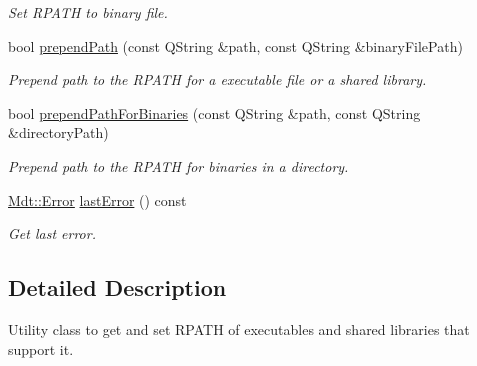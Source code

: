 \begin{DoxyCompactItemize}
\begin{DoxyCompactList}\small\item\em Set R\+P\+A\+TH to binary file. \end{DoxyCompactList}\item 
bool \hyperlink{class_mdt_1_1_deploy_utils_1_1_r_path_a382810e569023b6c28382dbaaf40daf2}{prepend\+Path} (const Q\+String \&path, const Q\+String \&binary\+File\+Path)\hypertarget{class_mdt_1_1_deploy_utils_1_1_r_path_a382810e569023b6c28382dbaaf40daf2}{}\label{class_mdt_1_1_deploy_utils_1_1_r_path_a382810e569023b6c28382dbaaf40daf2}

\begin{DoxyCompactList}\small\item\em Prepend {\itshape path} to the R\+P\+A\+TH for a executable file or a shared library. \end{DoxyCompactList}\item 
bool \hyperlink{class_mdt_1_1_deploy_utils_1_1_r_path_ad40130b8aac917408c0bdb6e6e47b4e6}{prepend\+Path\+For\+Binaries} (const Q\+String \&path, const Q\+String \&directory\+Path)\hypertarget{class_mdt_1_1_deploy_utils_1_1_r_path_ad40130b8aac917408c0bdb6e6e47b4e6}{}\label{class_mdt_1_1_deploy_utils_1_1_r_path_ad40130b8aac917408c0bdb6e6e47b4e6}

\begin{DoxyCompactList}\small\item\em Prepend {\itshape path} to the R\+P\+A\+TH for binaries in a directory. \end{DoxyCompactList}\item 
\hyperlink{class_mdt_1_1_error}{Mdt\+::\+Error} \hyperlink{class_mdt_1_1_deploy_utils_1_1_r_path_a649c064bd1468bfa8f4c2f29d05e9ec0}{last\+Error} () const \hypertarget{class_mdt_1_1_deploy_utils_1_1_r_path_a649c064bd1468bfa8f4c2f29d05e9ec0}{}\label{class_mdt_1_1_deploy_utils_1_1_r_path_a649c064bd1468bfa8f4c2f29d05e9ec0}

\begin{DoxyCompactList}\small\item\em Get last error. \end{DoxyCompactList}\end{DoxyCompactItemize}


\subsection{Detailed Description}
Utility class to get and set R\+P\+A\+TH of executables and shared libraries that support it. 


